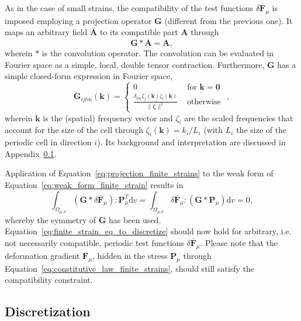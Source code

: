 As in the case of small strains, the compatibility of the test functions \(\delta \bm{F}_\mu\) is imposed employing a projection operator \(\bm{G}\) (different from the previous one).
It maps an arbitrary field \(\bar{\bm A}\) to its compatible part \(\bm A\) through
\begin{equation} \label{eq:projection_finite_strains}
\bm{G} * \overline{\bm{A}}=\bm{A},
\end{equation}
wherein \(*\) is the convolution operator.
The convolution can be evaluated in Fourier space as a simple, local, double tensor contraction.
Furthermore, \(\bm{G}\) has a simple closed-form expression in Fourier space,
\begin{equation}
\breve{\bm G}_{i j l m}\left(\bm{k}\right)=\begin{cases}
0 & \text { for } \bm k=\bm{0} \\[5pt]
\displaystyle{\frac{\delta_{i m} \zeta_{j}\left(\bm{k}\right) \zeta_{l}\left(\bm{k}\right)}{\|\bm{\zeta}\|^{2}} } & \text { otherwise }
\end{cases},
\end{equation}
wherein \(\bm{k}\) is the (spatial) frequency vector and \(\zeta_{i}\) are the scaled frequencies that account for the size of the cell through \(\zeta_{i}(\bm k)=k_{i} / L_{i}\) (with \(L_{i}\) the size of the periodic cell in direction \(i\)).
Its background and interpretation are discussed in Appendix~\ref{}.

Application of Equation~\ref{eq:projection_finite_strains} to the weak form of Equation~\ref{eq:weak_form_finite_strain} results in
\begin{equation} \label{eq:finite_strain_eq_to_discretize}
\int_{\Omega_{\mu,0}}(\bm{G} * \delta \bar{\bm{F}}_\mu): \bm{P}_\mu^{T} \mathrm{d} v=\int_{\Omega_{\mu,0}} \delta \bar{\bm{F}}_\mu:(\bm{G} * \bm{P}_\mu) \mathrm{d} v = 0,
\end{equation}
whereby the symmetry of \(\bm{G}\) has been used. Equation~\eqref{eq:finite_strain_eq_to_discretize} should now hold for arbitrary, i.e. not necessarily compatible, periodic test functions \(\delta \bar{\bm{F}}_\mu\).
Please note that the deformation gradient \(\bm{F}_\mu\), hidden in the stress \(\bm{P}_\mu\) through Equation~\eqref{eq:constitutive_law_finite_strains}, should still satisfy the compatibility constraint.

\subsection{Discretization}

